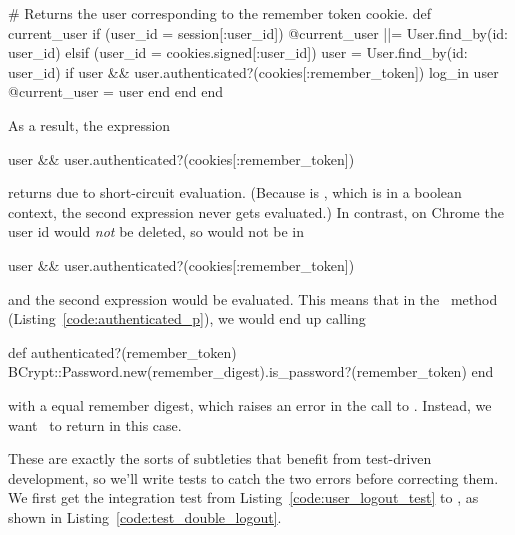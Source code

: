 \begin{code}
# Returns the user corresponding to the remember token cookie.
def current_user
  if (user_id = session[:user_id])
    @current_user ||= User.find_by(id: user_id)
  elsif (user_id = cookies.signed[:user_id])
    user = User.find_by(id: user_id)
    if user && user.authenticated?(cookies[:remember_token])
      log_in user
      @current_user = user
    end
  end
end
\end{code}

\noindent As a result, the expression

\begin{code}
user && user.authenticated?(cookies[:remember_token])
\end{code}

\noindent returns  due to short-circuit evaluation. (Because  is , which is  in a boolean context, the second expression never gets evaluated.) In contrast, on Chrome the user id would \emph{not} be deleted, so  would not be  in

\begin{code}
user && user.authenticated?(cookies[:remember_token])
\end{code}

\noindent and the second expression would be evaluated. This means that in the \ method (Listing~\ref{code:authenticated_p}), we would end up calling

\begin{code}
def authenticated?(remember_token)
  BCrypt::Password.new(remember_digest).is_password?(remember_token)
end
\end{code}

\noindent with a  equal  remember digest, which raises an error in the call to . Instead, we want \ to return  in this case.

These are exactly the sorts of subtleties that benefit from test-driven development, so we'll write tests to catch the two errors before correcting them. We first get the integration test from Listing~\ref{code:user_logout_test} to \failing, as shown in Listing~\ref{code:test_double_logout}.

